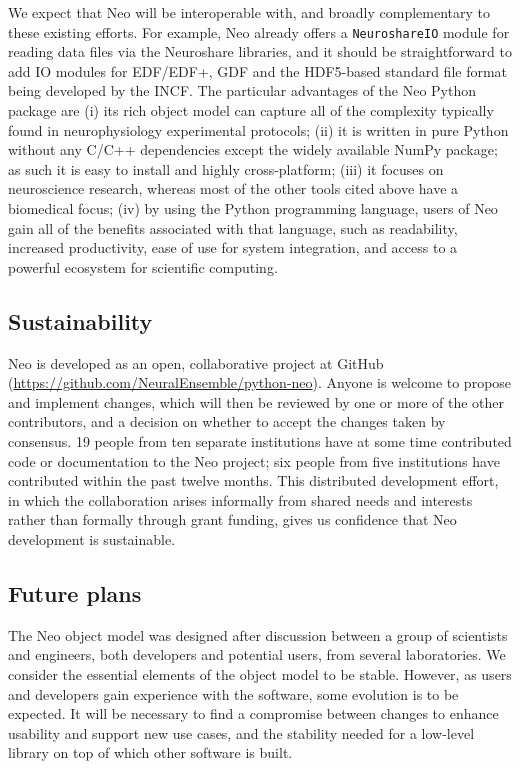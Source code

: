 \documentclass{frontiers}
\begin{document}
We expect that Neo will be interoperable with, and broadly complementary to these existing efforts. 
For example, Neo already offers a \lstinline`NeuroshareIO` module for reading data files via the Neuroshare libraries, and it should be straightforward to add IO modules for EDF/EDF+, GDF and the HDF5-based standard file format being developed by the INCF.
The particular advantages of the Neo Python package are 
(i) its rich object model can capture all of the complexity typically found in neurophysiology experimental protocols; 
(ii) it is written in pure Python without any C/C++ dependencies except the widely available NumPy package; as such it is easy to install and highly cross-platform; 
(iii) it focuses on neuroscience research, whereas most of the other tools cited above have a biomedical focus; 
(iv) by using the Python programming language, users of Neo gain all of the benefits associated with that language, such as readability, increased productivity, ease of use for system integration, and access to a powerful ecosystem for scientific computing.


\subsection{Sustainability}

Neo is developed as an open, collaborative project at GitHub
(\url{https://github.com/NeuralEnsemble/python-neo}).
Anyone is welcome to propose and implement changes, which will then be reviewed by one or more of the other contributors, and a decision on whether to accept the changes taken by consensus.
19 people from ten separate institutions have at some time contributed code or documentation to the Neo project;  six people from five institutions have contributed within the past twelve months.
This distributed development effort, in which the collaboration arises informally from shared needs and interests rather than formally through grant funding, gives us confidence that Neo development is sustainable.


\subsection{Future plans}

The Neo object model was designed after discussion between a group of scientists and engineers, both developers and potential users, from several laboratories. 
We consider the essential elements of the object model to be stable. 
However, as users and developers gain experience with the software, some evolution is to be expected.
It will be necessary to find a compromise between changes to enhance usability and support new use cases, and the stability needed for a low-level library on top of which other software is built.
\end{document}
